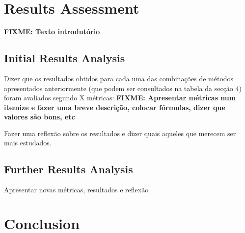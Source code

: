\documentclass[9pt,journal,compsoc]{IEEEtran}
\begin{document}
\section{Results Assessment}

\textbf{FIXME: Texto introdutório}

\subsection{Initial Results Analysis}

Dizer que os resultados obtidos para cada uma das combinações de métodos apresentados anteriormente (que podem ser consultados na tabela da secção 4) foram avaliados segundo X métricas: \textbf{FIXME: Apresentar métricas num itemize e fazer uma breve descrição, colocar fórmulas, dizer que valores são bons, etc}

Fazer uma reflexão sobre os resultados e dizer quais aqueles que merecem ser mais estudados.

\subsection{Further Results Analysis}

Apresentar novas métricas, resultados e reflexão

\section{Conclusion}
\label{conclusions}




\end{document}
